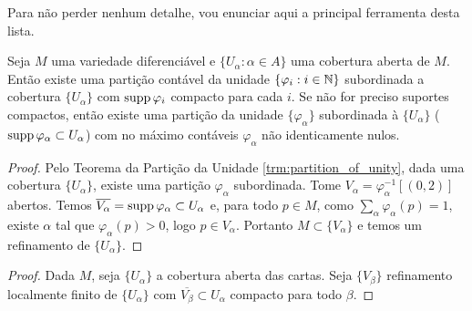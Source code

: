 Para não perder nenhum detalhe, vou enunciar aqui a principal ferramenta desta lista.
\begin{theorem}
    \label{trm:partition_of_unity}
    Seja $M$ uma variedade diferenciável e $\{U_\alpha: \alpha \in A\}$ uma cobertura aberta de $M$. Então existe uma partição contável da unidade
    $\{\varphi_i : i \in \mathbb{N}\}$ subordinada a cobertura $\{U_\alpha\}$ com $\operatorname{supp} \varphi_i$ compacto para cada $i$. Se não for preciso suportes compactos,
    então existe uma partição da unidade $\{\varphi_\alpha\}$ subordinada à $\{U_\alpha\}$ ($\operatorname{supp} \varphi_\alpha \subset U_\alpha$) com no máximo
    contáveis $\varphi_\alpha$ não identicamente nulos.
\end{theorem}

\prob

\begin{proof}
    Pelo Teorema da Partição da Unidade \ref{trm:partition_of_unity}, dada uma cobertura $\{U_\alpha\}$, existe uma partição $\varphi_\alpha$ subordinada.
    Tome $V_\alpha = \varphi_\alpha^{-1}[(0,2)]$ abertos. Temos $\overline{V_\alpha} = \operatorname{supp} \varphi_\alpha \subset U_\alpha$ e, para todo $p \in M$, como $\sum_\alpha \varphi_\alpha(p) = 1$,
    existe $\alpha$ tal que $\varphi_\alpha(p) > 0$, logo $p \in V_\alpha$. Portanto $M \subset \{V_\alpha\}$ e temos um refinamento de $\{U_\alpha\}$.
\end{proof}

\prob

\begin{proof}
    Dada $M$, seja $\{U_\alpha\}$ a cobertura aberta das cartas. Seja $\{V_\beta\}$ refinamento localmente finito de $\{U_\alpha\}$ com $\overline{V_\beta} \subset U_\alpha$ compacto para todo $\beta$. 
\end{proof}